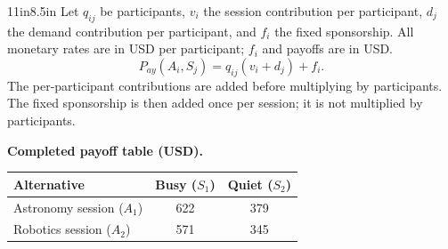 \begin{CalculationLandscape}{11in}{8.5in}
Let $q_{ij}$ be participants, $v_i$ the session contribution per participant,
$d_j$ the demand contribution per participant, and $f_i$ the fixed sponsorship.
All monetary rates are in USD per participant; $f_i$ and payoffs are in USD.
\[
P_{ay}(A_i,S_j)=q_{ij}(v_i+d_j)+f_i.
\]
The per-participant contributions are added before multiplying by participants.
The fixed sponsorship is then added once per session; it is not multiplied by participants.

\textbf{Completed payoff table (USD).}
\begin{center}
\begin{tabular}{@{}lcc@{}}\toprule
Alternative & Busy ($S_1$) & Quiet ($S_2$)\\\midrule
Astronomy session ($A_1$) & 622 & 379\\
Robotics session ($A_2$) & 571 & 345\\
\bottomrule\end{tabular}
\end{center}
\end{CalculationLandscape}

